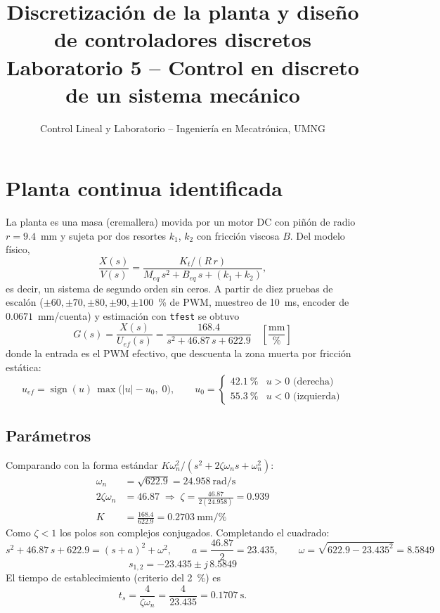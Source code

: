 \documentclass[11pt,letterpaper]{article}
\title{Discretización de la planta y diseño de controladores discretos\\
       \large Laboratorio 5 -- Control en discreto de un sistema mecánico}
\author{Control Lineal y Laboratorio -- Ingeniería en Mecatrónica, UMNG}
\date{}
\begin{document}
\maketitle

\section{Planta continua identificada}

La planta es una masa (cremallera) movida por un motor DC con piñón de radio
$r = 9.4$~mm y sujeta por dos resortes $k_1$, $k_2$ con fricción viscosa $B$.
Del modelo físico,
\begin{equation}
  \frac{X(s)}{V(s)} = \frac{K_t/(R\,r)}{M_{eq}\,s^2 + B_{eq}\,s + (k_1+k_2)},
\end{equation}
es decir, un sistema de segundo orden sin ceros. A partir de diez pruebas de
escalón ($\pm60,\pm70,\pm80,\pm90,\pm100$~\% de PWM, muestreo de 10~ms, encoder
de $0.0671$~mm/cuenta) y estimación con \texttt{tfest} se obtuvo
\begin{equation}
  \boxed{G(s) = \frac{X(s)}{U_{ef}(s)} = \frac{168.4}{s^2 + 46.87\,s + 622.9}
  \quad \left[\frac{\text{mm}}{\%}\right]}
  \label{eq:Gs}
\end{equation}
donde la entrada es el PWM efectivo, que descuenta la zona muerta por fricción
estática:
\begin{equation}
  u_{ef} = \operatorname{sign}(u)\,\max\bigl(|u| - u_0,\;0\bigr),
  \qquad u_0 = \begin{cases} 42.1~\% & u>0 \text{ (derecha)}\\
                              55.3~\% & u<0 \text{ (izquierda)}\end{cases}
\end{equation}

\subsection{Parámetros}
Comparando con la forma estándar $K\omega_n^2/(s^2+2\zeta\omega_n s+\omega_n^2)$:
\begin{align}
  \omega_n &= \sqrt{622.9} = 24.958~\text{rad/s}\\
  2\zeta\omega_n &= 46.87 \;\Rightarrow\; \zeta = \frac{46.87}{2(24.958)} = 0.939\\
  K &= \frac{168.4}{622.9} = 0.2703~\text{mm}/\%
\end{align}
Como $\zeta<1$ los polos son complejos conjugados. Completando el cuadrado:
\begin{equation}
  s^2 + 46.87\,s + 622.9 = (s+a)^2 + \omega^2,\qquad
  a = \frac{46.87}{2} = 23.435,\qquad
  \omega = \sqrt{622.9 - 23.435^2} = 8.5849
\end{equation}
\begin{equation}
  s_{1,2} = -23.435 \pm j\,8.5849
\end{equation}
El tiempo de establecimiento (criterio del 2~\%) es
\begin{equation}
  t_s = \frac{4}{\zeta\omega_n} = \frac{4}{23.435} = 0.1707~\text{s}.
\end{equation}
\end{document}
